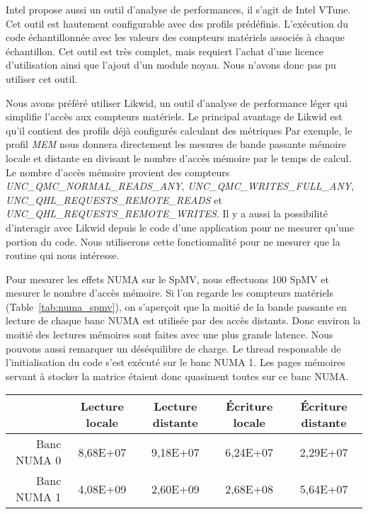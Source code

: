 Intel propose aussi un outil d'analyse de performances, il s'agit de Intel VTune.
%
Cet outil est hautement configurable avec des profils prédéfinis.
%
L'exécution du code échantillonnée avec les valeurs des compteurs matériels associés à chaque échantillon.
%
Cet outil est très complet, mais requiert l'achat d'une licence d'utilisation ainsi que l'ajout d'un module noyau.
%
Nous n'avons donc pas pu utiliser cet outil.



Nous avons préféré utiliser Likwid, un outil d'analyse de performance léger qui simplifie l'accès aux compteurs matériels.
%
Le principal avantage de Likwid est qu'il contient des profils déjà configurés calculant des métriques 
%
Par exemple, le profil {\em MEM} nous donnera directement les mesures de bande passante mémoire locale et distante en divisant le nombre d'accès mémoire par le temps de calcul.
%
Le nombre d'accès mémoire provient des compteurs {\em UNC\_QMC\_NORMAL\_READS\_ANY}, {\em UNC\_QMC\_WRITES\_FULL\_ANY}, {\em UNC\_QHL\_REQUESTS\_REMOTE\_READS} et {\em UNC\_QHL\_REQUESTS\_REMOTE\_WRITES}.
%
Il y a aussi la possibilité d'interagir avec Likwid depuis le code d'une application pour ne mesurer qu'une portion du code.
%
Nous utiliserons cette fonctionnalité pour ne mesurer que la routine qui nous intéresse.



Pour mesurer les effets NUMA sur le SpMV, nous effectuons 100 SpMV et mesurer le nombre d'accès mémoire.
%
Si l'on regarde les compteurs matériels (Table~\ref{tab:numa_spmv}), on s'aperçoit que la moitié de la bande passante en lecture de chaque banc NUMA est utilisée par des accès distants.
%
Donc environ la moitié des lectures mémoires sont faites avec une plus grande latence.
%
Nous pouvons aussi remarquer un déséquilibre de charge.
%
Le thread responsable de l'initialisation du code s'est exécuté sur le banc NUMA 1.
%
Les pages mémoires servant à stocker la matrice étaient donc quasiment toutes sur ce banc NUMA.

\begin{center}
  \begin{tabular}{|r|c|c|c|c|}
    \hline
                & Lecture locale & Lecture distante & \'Ecriture locale & \'Ecriture distante \\
    \hline
    Banc NUMA 0 & 8,68E+07  &  9,18E+07  &  6,24E+07  &  2,29E+07 \\
    Banc NUMA 1 & 4,08E+09  &  2,60E+09  &  2,68E+08  &  5,64E+07 \\
    \hline
  \end{tabular}
  \label{tab:numa_spmv}
\end{center}
